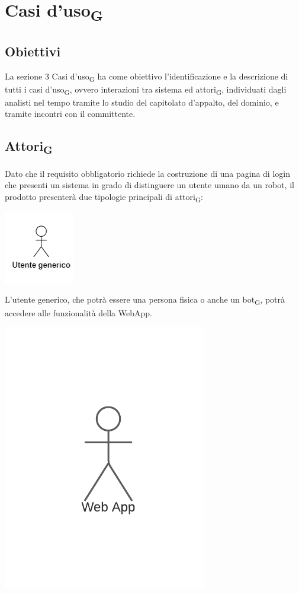 \section{Casi d'uso\textsubscript{G}}

\subsection{Obiettivi}
La sezione 3 Casi d'uso\textsubscript{G} ha come obiettivo l'identificazione e la descrizione di tutti i casi d'uso\textsubscript{G}, ovvero interazioni tra sistema ed attori\textsubscript{G}, individuati dagli analisti nel tempo tramite lo studio del capitolato d'appalto, del dominio, e tramite incontri con il committente.

\subsection{Attori\textsubscript{G}}
Dato che il requisito obbligatorio richiede la costruzione di una pagina di login che presenti un sistema in grado di distinguere un utente umano da un robot, il prodotto presenterà due tipologie principali di attori\textsubscript{G}:
\begin{center}
\includegraphics[scale = 1]{img/utente_generico.png}\\
\end{center}
L'utente generico, che potrà essere una persona fisica o anche un bot\textsubscript{G}, potrà accedere alle funzionalità della WebApp. \\
\begin{center}
\includegraphics[scale = 1]{img/webapp.png}\\
\end{center}
